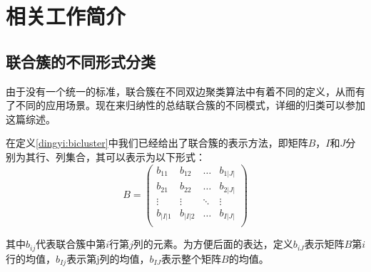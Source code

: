 
\chapter{相关工作简介}
\label{chapter:rw}

\section{联合簇的不同形式分类}
\label{sec:bicluster}
由于没有一个统一的标准，联合簇在不同双边聚类算法中有着不同的定义，从而有了不同的应用场景。现在来归纳性的总结联合簇的不同模式，详细的归类可以参加这篇综述\cite{pontes2015biclustering}。

在定义\ref{dingyi:bicluster}中我们已经给出了联合簇的表示方法，即矩阵$B$，$I$和$J$分别为其行、列集合，其可以表示为以下形式：
\begin{equation*}
  B = \left(
    \begin{array}{cccc}
      b_{11} & b_{12} & \ldots & b_{1|J|} \\
      b_{21} & b_{22} & \ldots & b_{2|J|} \\
      \vdots & \vdots & \ddots & \vdots \\
      b_{|I|1} & b_{|I|2} & \ldots & b_{I|J|} \\
    \end{array}
  \right)
\end{equation*}
\vspace{1mm}

其中$b_{ij}$代表联合簇中第$i$行第$j$列的元素。为方便后面的表达，定义$b_{iJ}$表示矩阵$B$第$i$行的均值，$b_{Ij}$表示第j列的均值，$b_{IJ}$表示整个矩阵$B$的均值。

